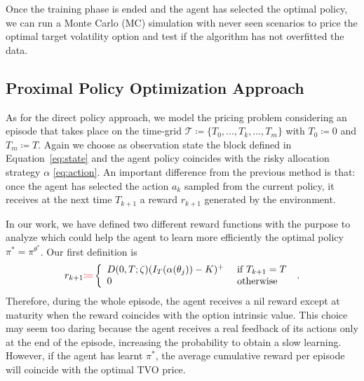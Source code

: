 \documentclass[runningheads]{m2ef}
\newcommand{\change}[1]{{\color{red} {#1}}}%
\begin{document}
Once the training phase is ended and the agent has selected the optimal policy, we can run a Monte Carlo (MC) simulation with never seen scenarios to price the optimal target volatility option and test if the algorithm has not overfitted the data.


\subsection{Proximal \change{P}olicy \change{O}ptimization \change{A}pproach}
As for the direct policy approach, we model the pricing problem considering an episode that takes place on the time-grid $\mathcal{T}\coloneqq \{T_0,...,T_k,...,T_m\}$ with $T_0\coloneqq 0$ and $T_m \coloneqq T$. Again we choose as observation state the block defined in Equation~\eqref{eq:state} and the agent policy coincides with the risky allocation strategy $\alpha$ \eqref{eq:action}. An important difference from the previous method is that: once the agent has selected the action $a_k$ sampled from the current policy, it receives at the next time $T_{k+1}$ a reward $r_{k+1}$ generated by the environment. 

In our work, we have defined two different reward functions with the purpose to analyze which could help the agent to learn more efficiently the optimal policy $\pi^* = \pi^{\theta^*}$. 
Our first definition is
 \begin{equation}
 	r_{k+1}\change{\coloneqq}\left\{\begin{array}{ll}
 		 D(0,T;\zeta)(I_T(\alpha(\theta_j)) - K)^+ & \text { if } T_{k+1} = T \\
 		0 & \text { otherwise }
 	\end{array}\right.
 \label{eq:reward1} \; . \end{equation}
Therefore, during the whole episode, the agent receives a nil reward except at maturity when the reward coincides with the option intrinsic value. This choice may seem too daring because the agent receives a real feedback of its actions only at the end of the episode, increasing the probability to obtain a slow learning. However, if the agent has learnt $\pi^*$, the average cumulative reward per episode will coincide with the optimal TVO price. 
\end{document}
